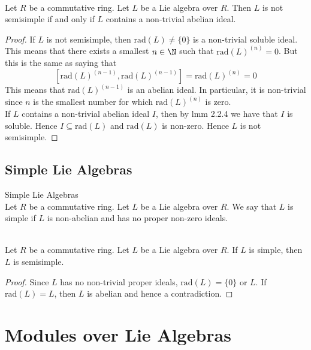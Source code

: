 \documentclass[a4paper]{article}
\begin{document}
\begin{lmm}{}{}\\
Let $R$ be a commutative ring. Let $L$ be a Lie algebra over $R$. Then $L$ is not semisimple if and only if $L$ contains a non-trivial abelian ideal. 
\begin{proof}
If $L$ is not semisimple, then $\text{rad}(L)\neq\{0\}$ is a non-trivial soluble ideal. This means that there exists a smallest $n\in\N$ such that $\text{rad}(L)^{(n)}=0$. But this is the same as saying that $$[\text{rad}(L)^{(n-1)},\text{rad}(L)^{(n-1)}]=\text{rad}(L)^{(n)}=0$$ This means that $\text{rad}(L)^{(n-1)}$ is an abelian ideal. In particular, it is non-trivial since $n$ is the smallest number for which $\text{rad}(L)^{(n)}$ is zero. \\

If $L$ contains a non-trivial abelian ideal $I$, then by lmm 2.2.4 we have that $I$ is soluble. Hence $I\subseteq\text{rad}(L)$ and $\text{rad}(L)$ is non-zero. Hence $L$ is not semisimple. 
\end{proof}
\end{lmm}

\subsection{Simple Lie Algebras}
\begin{defn}{Simple Lie Algebras}{}\\
Let $R$ be a commutative ring. Let $L$ be a Lie algebra over $R$. We say that $L$ is simple if $L$ is non-abelian and has no proper non-zero ideals. 
\end{defn}

\begin{lmm}{}{}\\
Let $R$ be a commutative ring. Let $L$ be a Lie algebra over $R$. If $L$ is simple, then $L$ is semisimple. 
\begin{proof}
Since $L$ has no non-trivial proper ideals, $\text{rad}(L)=\{0\}$ or $L$. If $\text{rad}(L)=L$, then $L$ is abelian and hence a contradiction. 
\end{proof}
\end{lmm}

\pagebreak
\section{Modules over Lie Algebras}
\end{document}
